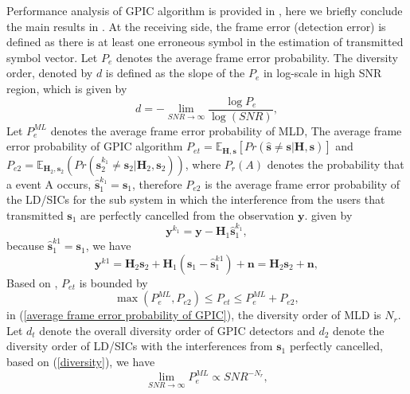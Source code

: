\documentclass[12pt, draftclsnofoot, onecolumn]{IEEEtran}
\begin{document}
Performance analysis of GPIC algorithm is provided in \cite{radji2009interference}, here we briefly conclude the main results in \cite{radji2009interference}. At the receiving side, the frame error (detection error) is defined as there is at least one erroneous symbol in the estimation of transmitted symbol vector. Let $P_{e}$ denotes the average frame error probability. The diversity order, denoted by $d$ is defined as the slope of the $P_{e}$ in log-scale in high SNR region, which is given by\cite{zheng2003diversity}
\begin{equation}
d=-\lim_{SNR\to\infty}\frac{\log{P_{e}}}{\log(SNR)},
\label{diversity}
\end{equation}
Let $P_{e}^{ML}$ denotes the average frame error probability of MLD, The average frame error probability of GPIC algorithm $P_{et}=\mathbb{E}_{\mathbf{H}, \mathbf{s}}[Pr(\hat{\mathbf{s}}\neq \mathbf{s}|\mathbf{H}, \mathbf{s})]$ and $P_{e2}=\mathbb{E}_{\mathbf{H}_{2}, \mathbf{s}_{2}}(Pr(\hat{\mathbf{s}}^{k_{1}}_{2}\neq \mathbf{s}_{2}|\mathbf{H}_{2}, \mathbf{s}_{2}))$, where $P_{r}(A)$ denotes the probability that a event A occurs, $\hat{\mathbf{s}}_{1}^{k_{1}}=\mathbf{s}_{1}$, therefore $P_{e2}$ is the average frame error probability of the LD/SICs for the sub system in which the interference from the users that transmitted $\mathbf{s}_{1}$ are perfectly cancelled from the observation $\mathbf{y}$. given by
\begin{equation}
\mathbf{y}^{k_{1}}=\mathbf{y}-\mathbf{H}_{1}\hat{\mathbf{s}}_{1}^{k_{1}},
\label{perfect IC}
\end{equation} 
because $\hat{\mathbf{s}}^{k1}_{1}=\mathbf{s}_{1}$, we have
\begin{equation}
\mathbf{y}^{k1}=\mathbf{H}_{2}\mathbf{s}_{2}+\mathbf{H}_{1}(\mathbf{s}_{1}-\hat{\mathbf{s}}_{1}^{k1})+\mathbf{n}=\mathbf{H}_{2}\mathbf{s}_{2}+\mathbf{n},
\label{sub MIMO system}
\end{equation} 
Based on \cite{radji2009interference}, $P_{et}$ is bounded by 
\begin{equation}
\max(P^{ML}_{e}, P_{e2})\leq P_{et}\leq P^{ML}_{e}+P_{e2}, 
\label{average frame error probability of GPIC}
\end{equation}
in (\ref{average frame error probability of GPIC}), the diversity order of MLD is $N_{r}$. Let $d_{t}$ denote the overall diversity order of GPIC detectors and $d_{2}$ denote the diversity order of LD/SICs with the interferences from $\mathbf{s}_{1}$ perfectly cancelled, based on (\ref{diversity}), we have 
\begin{equation}
\lim_{SNR\to\infty}P^{ML}_{e}\propto SNR^{-N_{r}},
\label{MLD diversity}
\end{equation}
\end{document}
